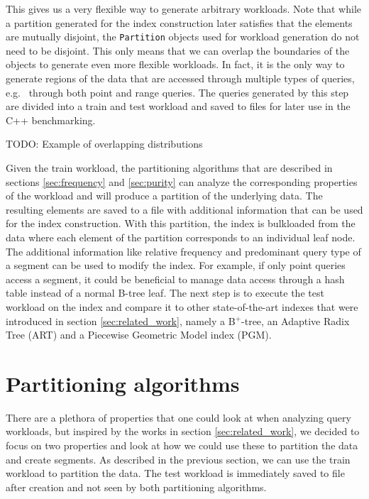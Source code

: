 This gives us a very flexible way to generate arbitrary workloads. Note that while a partition generated for the index construction later satisfies that the elements are mutually disjoint, the \verb|Partition| objects used for workload generation do not need to be disjoint. This only means that we can overlap the boundaries of the objects to generate even more flexible workloads. In fact, it is the only way to generate regions of the data that are accessed through multiple types of queries, e.g.~ through both point and range queries. The queries generated by this step are divided into a train and test workload and saved to files for later use in the C++ benchmarking.

TODO: Example of overlapping distributions

Given the train workload, the partitioning algorithms that are described in sections \ref{sec:frequency} and \ref{sec:purity} can analyze the corresponding properties of the workload and will produce a partition of the underlying data. The resulting elements are saved to a file with additional information that can be used for the index construction.
With this partition, the index is bulkloaded from the data where each element of the partition corresponds to an individual leaf node. The additional information like relative frequency and predominant query type of a segment can be used to modify the index. For example, if only point queries access a segment, it could be beneficial to manage data access through a hash table instead of a normal B-tree leaf. The next step is to execute the test workload on the index and compare it to other state-of-the-art indexes that were introduced in section \ref{sec:related_work}, namely a B$^+$-tree, an Adaptive Radix Tree (ART) and a Piecewise Geometric Model index (PGM).

\section{Partitioning algorithms}
There are a plethora of properties that one could look at when analyzing query workloads, but inspired by the works in section \ref{sec:related_work}, we decided to focus on two properties and look at how we could use these to partition the data and create segments. As described in the previous section, we can use the train workload to partition the data. The test workload is immediately saved to file after creation and not seen by both partitioning algorithms. 

